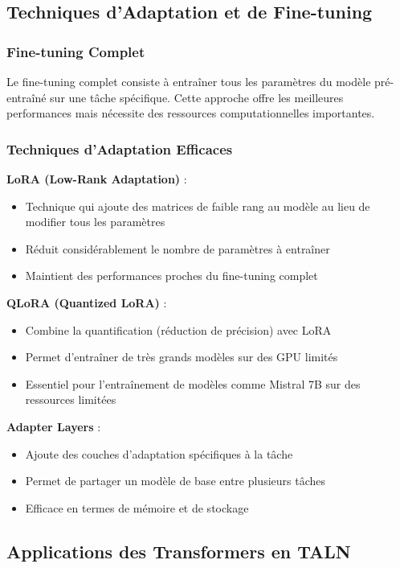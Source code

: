 \subsection{Techniques d'Adaptation et de Fine-tuning}

\subsubsection{Fine-tuning Complet}

Le fine-tuning complet consiste à entraîner tous les paramètres du modèle pré-entraîné sur une tâche spécifique. Cette approche offre les meilleures performances mais nécessite des ressources computationnelles importantes.

\subsubsection{Techniques d'Adaptation Efficaces}

\textbf{LoRA (Low-Rank Adaptation)} :
\begin{itemize}
    \item Technique qui ajoute des matrices de faible rang au modèle au lieu de modifier tous les paramètres
    \item Réduit considérablement le nombre de paramètres à entraîner
    \item Maintient des performances proches du fine-tuning complet
\end{itemize}

\textbf{QLoRA (Quantized LoRA)} :
\begin{itemize}
    \item Combine la quantification (réduction de précision) avec LoRA
    \item Permet d'entraîner de très grands modèles sur des GPU limités
    \item Essentiel pour l'entraînement de modèles comme Mistral 7B sur des ressources limitées
\end{itemize}

\textbf{Adapter Layers} :
\begin{itemize}
    \item Ajoute des couches d'adaptation spécifiques à la tâche
    \item Permet de partager un modèle de base entre plusieurs tâches
    \item Efficace en termes de mémoire et de stockage
\end{itemize}

\subsection{Applications des Transformers en TALN}

